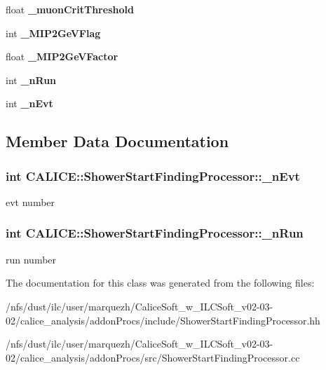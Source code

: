 \begin{DoxyCompactItemize}
\item 
float {\bfseries \-\_\-muon\-Crit\-Threshold}\label{classCALICE_1_1ShowerStartFindingProcessor_a066b28ed7384246a9562247c5fddcee4}

\item 
int {\bfseries \-\_\-\-M\-I\-P2\-Ge\-V\-Flag}\label{classCALICE_1_1ShowerStartFindingProcessor_a267cc5b391e7cdf1f656ce4cfbf5b454}

\item 
float {\bfseries \-\_\-\-M\-I\-P2\-Ge\-V\-Factor}\label{classCALICE_1_1ShowerStartFindingProcessor_a7c989a2d5f1ea4770c3a0612eda6d5a5}

\item 
int {\bf \-\_\-n\-Run}
\item 
int {\bf \-\_\-n\-Evt}
\end{DoxyCompactItemize}


\subsection{Member Data Documentation}
\subsubsection[{\-\_\-n\-Evt}]{\setlength{\rightskip}{0pt plus 5cm}int C\-A\-L\-I\-C\-E\-::\-Shower\-Start\-Finding\-Processor\-::\-\_\-n\-Evt\hspace{0.3cm}{\ttfamily [protected]}}\label{classCALICE_1_1ShowerStartFindingProcessor_a72c7d1f00d408a32614f91212cd900f1}
evt number 
\subsubsection[{\-\_\-n\-Run}]{\setlength{\rightskip}{0pt plus 5cm}int C\-A\-L\-I\-C\-E\-::\-Shower\-Start\-Finding\-Processor\-::\-\_\-n\-Run\hspace{0.3cm}{\ttfamily [protected]}}\label{classCALICE_1_1ShowerStartFindingProcessor_a99b1ddb20243bd7f438522b8d9f3da0e}
run number 

The documentation for this class was generated from the following files\-:\begin{DoxyCompactItemize}
\item 
/nfs/dust/ilc/user/marquezh/\-Calice\-Soft\-\_\-w\-\_\-\-I\-L\-C\-Soft\-\_\-v02-\/03-\/02/calice\-\_\-analysis/addon\-Procs/include/Shower\-Start\-Finding\-Processor.\-hh\item 
/nfs/dust/ilc/user/marquezh/\-Calice\-Soft\-\_\-w\-\_\-\-I\-L\-C\-Soft\-\_\-v02-\/03-\/02/calice\-\_\-analysis/addon\-Procs/src/Shower\-Start\-Finding\-Processor.\-cc\end{DoxyCompactItemize}
